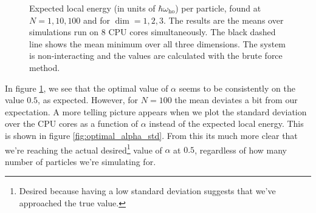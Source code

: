 \documentclass[
]{article}
\begin{document}
\begin{figure}[ht]
  \caption{Expected local energy (in units of $\hbar\omega_\text{ho}$) per particle, found at $N=1,10,100$ and for $\dim= 1,2,3$. The results are the means over simulations run on 8 CPU cores simultaneously. The black dashed line shows the mean minimum over all three dimensions. The system is non-interacting and the values are calculated with the brute force method.}
  \label{fig:optimal_alpha}
\end{figure}

In figure \ref{fig:optimal_alpha}, we see that the optimal value of
\(\alpha\) seems to be consistently on the value \(0.5\), as expected.
However, for \(N = 100\) the mean deviates a bit from our expectation. A
more telling picture appears when we plot the standard deviation over
the CPU cores as a function of \(\alpha\) instead of the expected local
energy. This is shown in figure \ref{fig:optimal_alpha_std}. From this
its much more clear that we're reaching the actual desired\footnote{Desired
  because having a low standard deviation suggests that we've approached
  the true value.} value of \(\alpha\) at \(0.5\), regardless of how
many number of particles we're simulating for.
\end{document}
